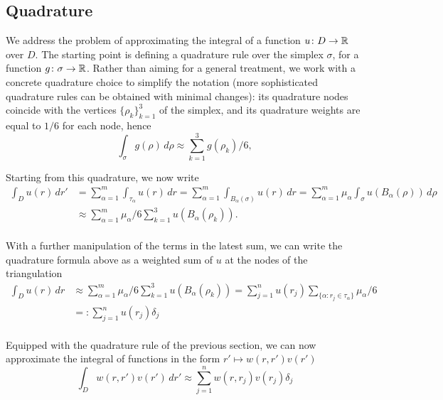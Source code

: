 \documentclass[a4paper]{siamonline220329}
\theoremstyle{plain}
\begin{document}
\subsection{Quadrature}\label{ssec:quadrature} We address the problem of
approximating the integral of a function $u \colon D \to \mathbb{R}$ over $D$. The
starting point is defining a quadrature rule over the simplex $\sigma$, for a
function $g \colon \sigma \to \mathbb{R}$. Rather than aiming for a general treatment,
we work with a concrete quadrature choice to simplify the notation (more
sophisticated quadrature rules can be obtained with minimal changes): its quadrature
nodes coincide with the vertices $\{ \rho_k \}_{k=1}^3$ of the simplex,
and its quadrature weights are equal to $1/6$ for each node, hence
\[
  \int_{\sigma} g(\rho) \,d \rho \approx
  \sum_{k=1}^3 g(\rho_k)/6, 
\]

Starting from this quadrature, we now write
\[
  \begin{aligned}
  \int_{D} u(r) \,d r'
  &
  = \sum_{\alpha=1}^m \int_{\tau_\alpha} u(r) \,d r 
  = \sum_{\alpha=1}^m \int_{B_\alpha(\sigma)} u(r) \,dr
  = \sum_{\alpha=1}^m \mu_\alpha \int_{\sigma} u(B_\alpha(\rho)) \,d\rho
  \\
  &
  \approx
  \sum_{\alpha=1}^m \mu_\alpha/6 \sum_{k=1}^3 u(B_\alpha(\rho_k)).
   \\
  \end{aligned}
\]

With a further manipulation of the terms in the latest sum, we can write the quadrature
formula above as a weighted sum of $u$ at the nodes of the triangulation 
\[
  \begin{aligned}
  \int_{D} u(r) \,d r
  &
  \approx
  \sum_{\alpha=1}^m \mu_\alpha/6 \sum_{k=1}^3 u(B_\alpha(\rho_k))
  =
  \sum_{j=1}^{n} u(r_j) \sum_{\{ \alpha \colon r_j \in \tau_\alpha \}}
  \mu_\alpha/6
   \\
  &
  =:
  \sum_{j=1}^{n} u(r_j) \delta_j
   \\
  \end{aligned}
\]

Equipped with the quadrature rule of the previous section, we can now approximate the
integral of functions in the form $r' \mapsto w(r,r') v(r')$ 
\begin{equation}\label{eq:quadW}
  \int_{D} w(r,r') v(r')\,dr' \approx \sum_{j=1}^n w(r,r_j) v(r_j) \delta_j
\end{equation}
\end{document}
